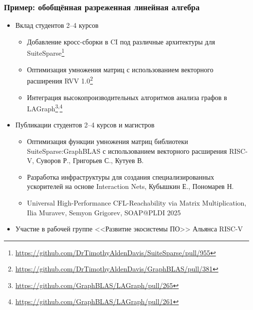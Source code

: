 \documentclass[xcolor=table,aspectratio=169]{beamer}
\begin{document}
\begin{frame}[fragile]
  \frametitle{Пример: обобщённая разреженная линейная алгебра}
  \begin{itemize}
    \item Вклад студентов 2--4 курсов
      \begin{itemize}
        \item Добавление кросс-сборки в CI под различные архитектуры для SuiteSparse\footnote{\url{https://github.com/DrTimothyAldenDavis/SuiteSparse/pull/955}}
        \item Оптимизация умножения матриц с использованием векторного расширения RVV 1.0\footnote{\url{https://github.com/DrTimothyAldenDavis/GraphBLAS/pull/381}}
        \item Интеграция высокопроизводительных алгоритмов анализа графов в LAGraph\footnote{\url{https://github.com/GraphBLAS/LAGraph/pull/265}}\textsuperscript{,}\footnote{\url{https://github.com/GraphBLAS/LAGraph/pull/261}}
      \end{itemize}
    \item Публикации студентов 2--4 курсов и магистров
    \begin{itemize}
      \item Оптимизация функции умножения матриц библиотеки SuiteSparse:GraphBLAS с использованием векторного расширения RISC-V, Суворов Р., Григорьев С., Кутуев В. 
      \item Разработка инфраструктуры для создания специализированных ускорителей на основе Interaction Nets, Кубышкин Е., Пономарев Н.
      \item Universal High-Performance CFL-Reachability via Matrix Multiplication, Ilia Muravev, Semyon Grigorev, SOAP@PLDI 2025
    \end{itemize}
    \item Участие в рабочей группе <<Развитие экосистемы ПО>> Альянса RISC-V
  \end{itemize}
\end{frame}
\end{document}
